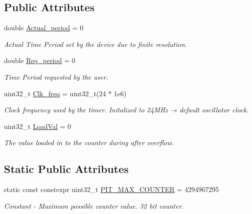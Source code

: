 \subsection*{Public Attributes}
\begin{DoxyCompactItemize}
\item 
double \hyperlink{classPITController_a549601e7c66941d7872a6e7d38ed9563}{Actual\+\_\+period} = 0
\begin{DoxyCompactList}\small\item\em Actual Time Period set by the device due to finite resolution. \end{DoxyCompactList}\item 
double \hyperlink{classPITController_a9de0af49a52145c8d2a8f4e90a519b60}{Req\+\_\+period} = 0
\begin{DoxyCompactList}\small\item\em Time Period requested by the user. \end{DoxyCompactList}\item 
uint32\+\_\+t \hyperlink{classPITController_ae3d74bb18e5b22769e895f592cb16129}{Clk\+\_\+freq} = uint32\+\_\+t(24 $\ast$ 1e6)
\begin{DoxyCompactList}\small\item\em Clock frequency used by the timer. Initalized to 24\+M\+Hz → default oscillator clock. \end{DoxyCompactList}\item 
uint32\+\_\+t \hyperlink{classPITController_ad253f0ac646573e5b08e050b6fab5e32}{Load\+Val} = 0
\begin{DoxyCompactList}\small\item\em The value loaded in to the counter during after overflow. \end{DoxyCompactList}\end{DoxyCompactItemize}
\subsection*{Static Public Attributes}
\begin{DoxyCompactItemize}
\item 
static const constexpr uint32\+\_\+t \hyperlink{classPITController_a53778fe7e47ac9741bef0bc190e0646a}{P\+I\+T\+\_\+\+M\+A\+X\+\_\+\+C\+O\+U\+N\+T\+ER} = 4294967295
\begin{DoxyCompactList}\small\item\em Constant -\/ Maximum possible counter value. 32 bit counter. \end{DoxyCompactList}\end{DoxyCompactItemize}


